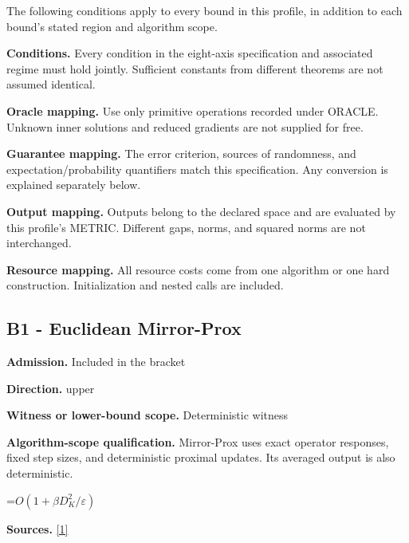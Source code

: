\documentclass[10pt,a4paper]{article}
\newcommand{\AtlasMath}[1]{\par\begingroup\centering\setbox0=\hbox{$\displaystyle #1$}\ifdim\wd0>1.4\linewidth\typeout{ATLAS WIDE FORMULA: \the\wd0}\fi\ifdim\wd0>\linewidth\resizebox{\linewidth}{!}{\box0}\else\box0\fi\par\endgroup}
\begin{document}
The following conditions apply to every bound in this profile, in addition to each bound's stated region and algorithm scope.



\textbf{Conditions.} Every condition in the eight-axis specification and associated regime must hold jointly. Sufficient constants from different theorems are not assumed identical.



\textbf{Oracle mapping.} Use only primitive operations recorded under ORACLE. Unknown inner solutions and reduced gradients are not supplied for free.



\textbf{Guarantee mapping.} The error criterion, sources of randomness, and expectation/probability quantifiers match this specification. Any conversion is explained separately below.



\textbf{Output mapping.} Outputs belong to the declared space and are evaluated by this profile's METRIC. Different gaps, norms, and squared norms are not interchanged.



\textbf{Resource mapping.} All resource costs come from one algorithm or one hard construction. Initialization and nested calls are included.



\subsection{B1 - Euclidean Mirror-Prox}


\textbf{Admission.} Included in the bracket



\textbf{Direction.} upper



\textbf{Witness or lower-bound scope.} Deterministic witness



\textbf{Algorithm-scope qualification.} Mirror-Prox uses exact operator responses, fixed step sizes, and deterministic proximal updates. Its averaged output is also deterministic.



\AtlasMath{O(1+\beta D_K^2/\varepsilon)}


\textbf{Sources.} \href{https://www2.isye.gatech.edu/~nemirovs/SIOPT_MP_2004.pdf}{[1]}
\end{document}
